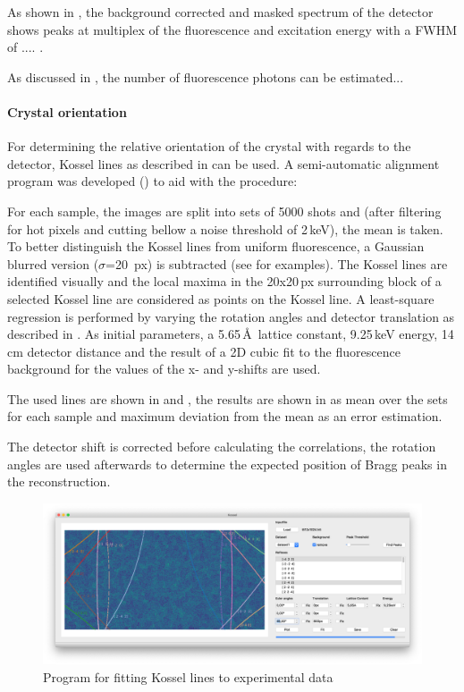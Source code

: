 As shown in , the background corrected and masked spectrum of the detector shows peaks at multiplex of the fluorescence and excitation energy with a FWHM of .... . 


As discussed in , the number of fluorescence photons can be estimated...




\paragraph{Crystal orientation}
For determining the relative orientation of the crystal with regards to the detector, Kossel lines as described in  can be used.  A semi-automatic alignment program was developed () to aid with the procedure: 

For each sample, the images are split into sets of 5000 shots and (after filtering for hot pixels and cutting bellow a noise threshold of 2\,keV), the mean is taken. To better distinguish the Kossel lines from uniform fluorescence, a Gaussian blurred version ($\sigma$=20\, px) is subtracted (see  for examples). The Kossel lines are identified visually and the local maxima in the 20x20\,px surrounding block of a selected Kossel line are considered as points on the Kossel line. A least-square regression is performed by varying the rotation angles and detector translation as described in . 
As initial parameters, a 5.65\,\AA\, lattice constant, 9.25\,keV energy, 14\,cm detector distance and the result of a 2D cubic fit to the fluorescence background for the values of the x- and y-shifts are used. 

The used lines are shown in  and , the results are shown in  as mean over the sets for each sample and maximum deviation from the mean as an error estimation.

The detector shift is corrected before calculating the correlations, the rotation angles are used afterwards to determine the expected position of Bragg peaks in the reconstruction.
\begin{figure}
	\centering
	\includegraphics[width=0.8\linewidth]{images/kosselfit.png}
	\caption{Program for fitting Kossel lines to experimental data}
	\label{fig:kosselfit}
\end{figure}




